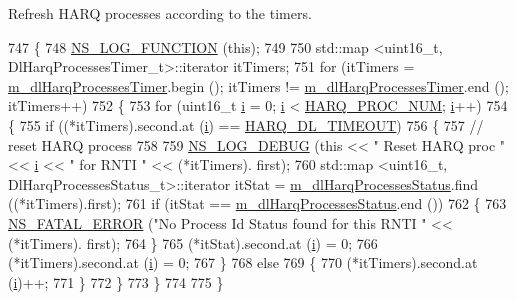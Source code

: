 Refresh H\+A\+RQ processes according to the timers. 


\begin{DoxyCode}
747 \{
748   \hyperlink{log-macros-disabled_8h_a90b90d5bad1f39cb1b64923ea94c0761}{NS\_LOG\_FUNCTION} (\textcolor{keyword}{this});
749 
750   std::map <uint16\_t, DlHarqProcessesTimer\_t>::iterator itTimers;
751   \textcolor{keywordflow}{for} (itTimers = \hyperlink{classns3_1_1CqaFfMacScheduler_a2e130ab374b4770c3544495ba593f023}{m\_dlHarqProcessesTimer}.begin (); itTimers != 
      \hyperlink{classns3_1_1CqaFfMacScheduler_a2e130ab374b4770c3544495ba593f023}{m\_dlHarqProcessesTimer}.end (); itTimers++)
752     \{
753       \textcolor{keywordflow}{for} (uint16\_t \hyperlink{bernuolliDistribution_8m_a6f6ccfcf58b31cb6412107d9d5281426}{i} = 0; \hyperlink{bernuolliDistribution_8m_a6f6ccfcf58b31cb6412107d9d5281426}{i} < \hyperlink{cqa-ff-mac-scheduler_8h_a9185d8d7d2b2979181d4a7044a3d3555}{HARQ\_PROC\_NUM}; \hyperlink{bernuolliDistribution_8m_a6f6ccfcf58b31cb6412107d9d5281426}{i}++)
754         \{
755           \textcolor{keywordflow}{if} ((*itTimers).second.at (\hyperlink{bernuolliDistribution_8m_a6f6ccfcf58b31cb6412107d9d5281426}{i}) == \hyperlink{cqa-ff-mac-scheduler_8h_add9e0c4889dc1b5b25686480b31ad166}{HARQ\_DL\_TIMEOUT})
756             \{
757               \textcolor{comment}{// reset HARQ process}
758 
759               \hyperlink{group__logging_ga413f1886406d49f59a6a0a89b77b4d0a}{NS\_LOG\_DEBUG} (\textcolor{keyword}{this} << \textcolor{stringliteral}{" Reset HARQ proc "} << \hyperlink{bernuolliDistribution_8m_a6f6ccfcf58b31cb6412107d9d5281426}{i} << \textcolor{stringliteral}{" for RNTI "} << (*itTimers).
      first);
760               std::map <uint16\_t, DlHarqProcessesStatus\_t>::iterator itStat = 
      \hyperlink{classns3_1_1CqaFfMacScheduler_ad68bd0730def22b00204de5f3a8fb109}{m\_dlHarqProcessesStatus}.find ((*itTimers).first);
761               \textcolor{keywordflow}{if} (itStat == \hyperlink{classns3_1_1CqaFfMacScheduler_ad68bd0730def22b00204de5f3a8fb109}{m\_dlHarqProcessesStatus}.end ())
762                 \{
763                   \hyperlink{group__fatal_ga5131d5e3f75d7d4cbfd706ac456fdc85}{NS\_FATAL\_ERROR} (\textcolor{stringliteral}{"No Process Id Status found for this RNTI "} << (*itTimers).
      first);
764                 \}
765               (*itStat).second.at (\hyperlink{bernuolliDistribution_8m_a6f6ccfcf58b31cb6412107d9d5281426}{i}) = 0;
766               (*itTimers).second.at (\hyperlink{bernuolliDistribution_8m_a6f6ccfcf58b31cb6412107d9d5281426}{i}) = 0;
767             \}
768           \textcolor{keywordflow}{else}
769             \{
770               (*itTimers).second.at (\hyperlink{bernuolliDistribution_8m_a6f6ccfcf58b31cb6412107d9d5281426}{i})++;
771             \}
772         \}
773     \}
774 
775 \}
\end{DoxyCode}


